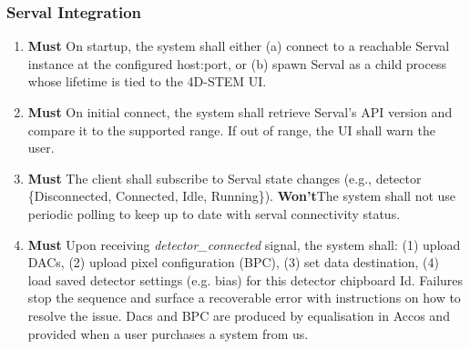 \documentclass[10pt]{article}
\newcommand{\PriorityTag}[2]{%
    \colorbox{#2!25}{\footnotesize\textsf{\textbf{#1}}}\hspace{0.6em}}
\newcommand{\must}{\leavevmode\PriorityTag{Must}{green}}
\newcommand{\could}{\leavevmode\PriorityTag{Could}{cyan}}
\newcommand{\wont}{\leavevmode\PriorityTag{Won't}{red}}
\newcounter{reqgrp}[section] %
\newcounter{reqno}
\newcommand{\reqprefix}{GEN}
\newenvironment{requirements}[1]{%
    \renewcommand{\reqprefix}{#1}%
    \refstepcounter{reqgrp}%
    \setcounter{reqno}{0}%
    \begin{enumerate}[leftmargin=*]
    }{\end{enumerate}}
\begin{document}
    \subsubsection{Serval Integration}

    \begin{requirements}{SRV}

        \item \must {}
        {On startup, the system shall either (a) connect to a reachable Serval instance at the configured host:port, or (b) spawn Serval as a child process whose lifetime is tied to the 4D-STEM UI.}

        \item \must {}
        {On initial connect, the system shall retrieve Serval's API version and compare it to the supported range. If out of range, the UI shall warn the user.}

        \item \must {}
        {The client shall subscribe to Serval state changes (e.g., detector \{Disconnected, Connected, Idle, Running\}). \wont The system shall not use periodic polling to keep up to date with serval connectivity status.}
        \item \must {}
        {Upon receiving \emph{detector\_connected} signal, the system shall: (1) upload DACs, (2) upload pixel configuration (BPC), (3) set data destination, (4) load saved detector settings (e.g. bias) for this detector chipboard Id. Failures stop the sequence and surface a recoverable error with instructions on how to resolve the issue. Dacs and BPC are produced by equalisation in Accos and provided when a user purchases a system from us.}


\end{requirements}
\end{document}
